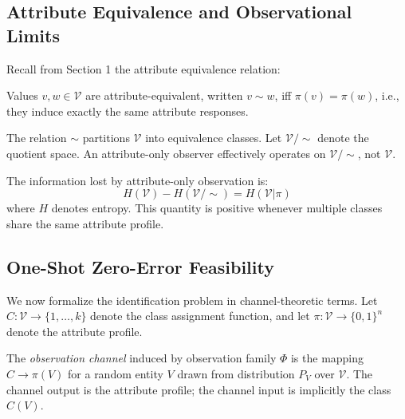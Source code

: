 \subsection{Attribute Equivalence and Observational Limits}

Recall from Section 1 the attribute equivalence relation:

\begin{definition}
Values $v, w \in \mathcal{V}$ are attribute-equivalent, written $v \sim w$, iff $\pi(v) = \pi(w)$, i.e., they induce exactly the same attribute responses.
\end{definition}

\begin{proposition}\label{prop:equivalence-class-structure}
The relation $\sim$ partitions $\mathcal{V}$ into equivalence classes. Let $\mathcal{V}/{\sim}$ denote the quotient space. An attribute-only observer effectively operates on $\mathcal{V}/{\sim}$, not $\mathcal{V}$.
\end{proposition}

\begin{corollary}\label{cor:information-loss-quantification}
The information lost by attribute-only observation is:
\[
H(\mathcal{V}) - H(\mathcal{V}/{\sim}) = H(\mathcal{V} | \pi)
\]
where $H$ denotes entropy. This quantity is positive whenever multiple classes share the same attribute profile.
\end{corollary}

\subsection{One-Shot Zero-Error Feasibility}\label{sec:identification-capacity}

We now formalize the identification problem in channel-theoretic terms. Let $C: \mathcal{V} \to \{1, \ldots, k\}$ denote the class assignment function, and let $\pi: \mathcal{V} \to \{0,1\}^n$ denote the attribute profile.

\begin{definition}
The \emph{observation channel} induced by observation family $\Phi$ is the mapping $C \to \pi(V)$ for a random entity $V$ drawn from distribution $P_V$ over $\mathcal{V}$. The channel output is the attribute profile; the channel input is implicitly the class $C(V)$.
\end{definition}

